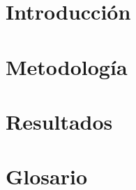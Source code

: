 \documentclass{templateRevistaUPTCCiencias}
\begin{document}
\section{Introducción}
\label{sec:introduccion}


\section{Metodología}
\label{sec:metodologia}


\section{Resultados}
\label{sec:resultados}



\clearpage %





\appendix
\section{Glosario}
\label{sec:glosario}

\end{document}
